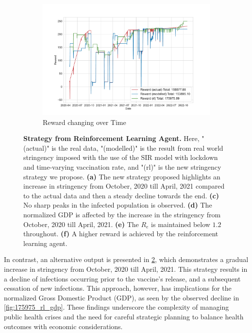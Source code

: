 \documentclass[tikz,fleqn,12pt]{wlscirep}
\begin{document}
\begin{figure}[htbp!]
\begin{subfigure}[t]{0.48\textwidth}
    \includegraphics[width=\linewidth]{images/175975/rl_reward.pdf}
    \caption{Reward changing over Time}
    \label{fig:175975_rl_reward}
  \end{subfigure}
  \caption{\textbf{Strategy from Reinforcement Learning Agent.} Here, "(actual)" is the real data, "(modelled)" is the result from real world stringency imposed with the use of the SIR model with lockdown and time-varying vaccination rate, and "(rl)" is the new stringency strategy we propose. \textbf{(a)} The new strategy proposed highlights an increase in stringency from October, 2020 till April, 2021 compared to the actual data and then a steady decline towards the end. \textbf{(c)} No sharp peaks in the infected population is observed. \textbf{(d)} The normalized GDP is affected by the increase in the stringency from October, 2020 till April, 2021. \textbf{(e)} The $R_e$ is maintained below $1.2$ throughout. \textbf{(f)} A higher reward is achieved by the reinforcement learning agent.}
  \label{fig:175975_parent}
\end{figure}

In contrast, an alternative output is presented in \cref{fig:175975_parent}, which demonstrates a gradual increase in stringency from October, 2020 till April, 2021. This strategy results in a decline of infections occurring prior to the vaccine's release, and a subsequent cessation of new infections. This approach, however, has implications for the normalized Gross Domestic Product (GDP), as seen by the observed decline in \cref{fig:175975_rl_gdp}. These findings underscore the complexity of managing public health crises and the need for careful strategic planning to balance health outcomes with economic considerations.
\end{document}
